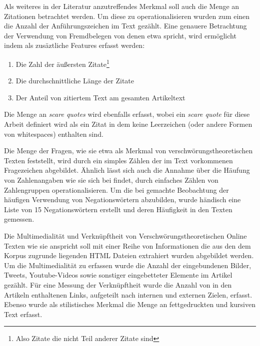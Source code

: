 Als weiteres in der Literatur anzutreffendes Merkmal soll auch die Menge an Zitationen betrachtet werden.
Um diese zu operationalisieren wurden zum einen die Anzahl der Anführungszeichen im Text gezählt.
Eine genauere Betrachtung der Verwendung von Fremdbelegen von denen etwa \textcite[235]{schafer_2018} spricht, wird ermöglicht indem als zusäztliche Features erfasst werden:
\begin{enumerate}
    \item Die Zahl der äußersten Zitate\footnote{Also Zitate die nicht Teil anderer Zitate sind}
    \item Die durchschnittliche Länge der Zitate
    \item Der Anteil von zitiertem Text am gesamten Artikeltext
\end{enumerate}

Die Menge an \textit{scare quotes} wird ebenfalls erfasst, wobei ein \textit{scare quote} für diese Arbeit definiert wird als ein Zitat in dem keine Leerzeichen (oder andere Formen von whitespaces) enthalten sind.

Die Menge der Fragen, wie sie etwa \textcite[205]{filatkina_2018} als Merkmal von verschwörungstheoretischen Texten feststellt, wird durch ein simples Zählen der im Text vorkommenen Fragezeichen abgebildet.
Ähnlich lässt sich auch die Annahme über die Häufung von Zahlenangaben wie sie sich bei \textcite[234]{schafer_2018} findet, durch einfaches Zählen von Zahlengruppen operationalisieren.
Um die bei \textcite[149]{stumpf_2019} gemachte Beobachtung der häufigen Verwendung von Negationswörtern abzubilden, wurde händisch eine Liste von 15 Negationswörtern erstellt und deren Häufigkeit in den Texten gemessen.

Die Multimedialität und Verknüpftheit von Verschwörungstheoretischen Online Texten wie sie \textcite[10]{soukup_2008} anspricht soll mit einer Reihe von Informationen die aus den dem Korpus zugrunde liegenden HTML Dateien extrahiert wurden abgebildet werden.
Um die Multimedialität zu erfassen wurde die Anzahl der eingebundenen Bilder, Tweets, Youtube-Videos sowie sonstiger eingebetteter Elemente im Artikel gezählt.
Für eine Messung der Verknüpftheit wurde die Anzahl von in den Artikeln enthaltenen Links, aufgeteilt nach internen und externen Zielen, erfasst.
Ebenso wurde als stilistisches Merkmal die Menge an fettgedruckten und kursiven Text erfasst.

